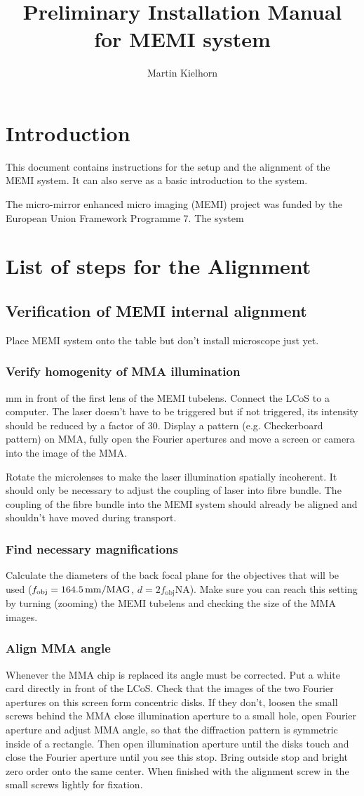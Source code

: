 \documentclass{scrartcl}
\title{Preliminary Installation Manual for MEMI system}
\author{Martin Kielhorn}
\begin{document}
\section{Introduction}
This document contains instructions for the setup and the alignment of
the MEMI system. It can also serve as a basic introduction to the
system.

The micro-mirror enhanced micro imaging (MEMI) project was funded by the
European Union Framework Programme 7. The system 

\section{List of steps for the Alignment}
\newcommand{\q}[1]{\subsection{#1}} 
\newcommand{\qq}[1]{\subsubsection{#1}} 

\q{Verification of MEMI internal alignment} Place MEMI system onto the
table but don't install microscope just yet.  

\qq{Verify homogenity of MMA illumination} \unit[250]{mm} in front of
the first lens of the MEMI tubelens. Connect the LCoS to a
computer. The laser doesn't have to be triggered but if not triggered,
its intensity should be reduced by a factor of 30. Display a pattern
(e.g. Checkerboard pattern) on MMA, fully open the Fourier apertures
and move a screen or camera into the image of the MMA.

Rotate the microlenses to make the laser illumination spatially
incoherent. It should only be necessary to adjust the coupling of
laser into fibre bundle. The coupling of the fibre bundle into the
MEMI system should already be aligned and shouldn't have moved during
transport.

\qq{Find necessary magnifications} Calculate the diameters of the back
focal plane for the objectives that will be used
($f_\textrm{obj}=\unit[164.5]{mm}/\textrm{MAG}$, $d=2 f_\textrm{obj}
\textrm{NA}$). Make sure you can reach this setting by turning
(zooming) the MEMI tubelens and checking the size of the MMA images.

\qq{Align MMA angle} Whenever the MMA chip is replaced its angle must
be corrected. Put a white card directly in front of the LCoS. Check
that the images of the two Fourier apertures on this screen form
concentric disks. If they don't, loosen the small screws behind the
MMA close illumination aperture to a small hole, open Fourier aperture
and adjust MMA angle, so that the diffraction pattern is symmetric
inside of a rectangle. Then open illumination aperture until the disks
touch and close the Fourier aperture until you see this stop.  Bring
outside stop and bright zero order onto the same center.  When
finished with the alignment screw in the small screws lightly for
fixation.
\end{document}
